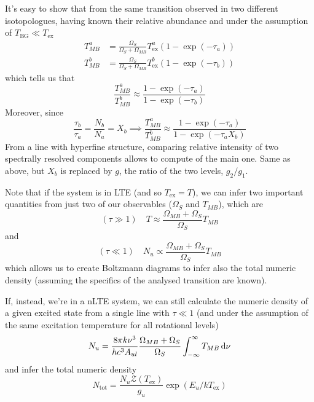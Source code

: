 It's easy to show that from the same transition observed in two different isotopologues, having known their relative abundance  and under the assumption of $T_{\text{BG}} \ll T_{\text{ex}}$
\begin{align*}
    T_{MB}^{a} &= \frac{\Omega_{S}}{\Omega_{S}+\Omega_{MB}}T_{\text{ex}}^{a}(1-\exp(-\tau_{a}))\\
    T_{MB}^{b} &= \frac{\Omega_{S}}{\Omega_{S}+\Omega_{MB}}T_{\text{ex}}^{b}(1-\exp(-\tau_{b}))
\end{align*}
which tells us that
\begin{equation}
    \frac{T_{MB}^{a}}{T_{MB}^{b}} \approx \frac{1-\exp(-\tau_{a})}{1-\exp(-\tau_{b})}
\end{equation}
Moreover, since
\begin{equation}
    \frac{\tau_{b}}{\tau_{a}} = \frac{N_{b}}{N_{a}} = X_{b} \implies \frac{T_{MB}^{a}}{T_{MB}^{b}} \approx \frac{1-\exp(-\tau_{a})}{1-\exp(-\tau_{a}X_{b})} 
\end{equation}
From a line with hyperfine structure, comparing relative intensity of two spectrally resolved components allows to compute of the main one. Same as above, but $X_{b}$ is replaced by $g$, the ratio of the two levels, $g_{2}/g_{1}$.
\par Note that if the system is in LTE (and so $T_{\text{ex}} = T$), we can infer two important quantities from just two of our observables ($\Omega_{S}$ and $T_{MB}$), which are 
\begin{equation}
    (\tau \gg 1) \quad T \approx \frac{\Omega_{MB}+\Omega_{S}}{\Omega_{S}}T_{MB}
\end{equation}
and 
\begin{equation}
    (\tau \ll 1) \quad N_{u} \propto \frac{\Omega_{MB}+\Omega_{S}}{\Omega_{S}}T_{MB}
\end{equation}
which allows us to create Boltzmann diagrams to infer also the total numeric density (assuming the specifics of the analysed transition are known).
\par If, instead, we're in a nLTE system, we can still calculate the numeric density of a given excited state from a single line with $\tau \ll 1$ (and under the assumption of the same excitation temperature for all rotational levels)
\begin{equation}
    N_{u} = \frac{8\pi k \nu^{3}}{hc^{3} A_{ul}}\frac{\Omega_{MB}+\Omega_{S}}{\Omega_{S}}\int_{-\infty}^{\infty} T_{MB}\,\text{d}\nu
\end{equation}
and infer the total numeric density 
\begin{equation}
    N_{\text{tot}} = \frac{N_{u}\mathcal{Z}(T_{\text{ex}})}{g_{u}}\exp(E_{u}/kT_{\text{ex}})
\end{equation}
